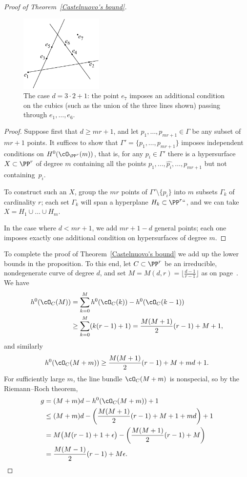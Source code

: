 \begin{proof}[Proof of Theorem~\ref{Castelnuovo's bound}]
\begin{figure}
\centerline {\includegraphics[height=1.5in]{"main/Fig09-3"}}
\caption{The case $d = 3\cdot 2+1$: the point $e_{7}$ imposes an additional
condition on the cubics (such as the union of the three lines shown)
passing through
$e_{1},\dots, e_{6}$.}
\label{Fig9.3}
\end{figure}

\begin{proof}
Suppose first that $d \geq mr+1$, and let $p_1,\dots,p_{mr+1} \in
\Gamma$ be any subset of $mr+1$ points. It suffices to show that
$\Gamma' = \{p_1,\dots,p_{mr+1}\}$ imposes independent conditions
on
$H^0(\cO_{\PP^r}(m))$, that is, for any $p_i \in \Gamma'$ there is a
hypersurface $X \subset \PP^r$ of degree $m$ containing all the points
$p_1,\dots, \hat{p_i},\dots,p_{mr+1}$ but not containing~$p_i$.

To construct such an $X$, group the $mr$ points of $\Gamma' \setminus
\{p_i\}$ into $m$ subsets $\Gamma_k$ of cardinality $r$; each set
$\Gamma_k$ will span a hyperplane $H_k \subset \PP^r` `$, and we can
take $X = H_1 \cup \dots \cup H_m$.

In the case where $d<mr+1$, we add $mr+1-d$ general points; each one
imposes exactly one
additional condition on hypersurfaces of degree $m$.
\end{proof}


To complete the proof of Theorem~\ref{Castelnuovo's bound} we add up the
lower bounds in the proposition. To this end, let $C \subset \PP^r$ be
 an irreducible, nondegenerate curve of degree $d$, and  set
$M= M(d,r) = \bigl\lfloor{\frac{d-1}{r-1}}\bigr\rfloor$
as on page~\pageref{def of M}.
We have
\begin{align*}
h^0(\cO_C(M)) &= \sum_{k=0}^M h^0(\cO_C(k)) - h^0(\cO_C(k-1)) \\
&\geq  \sum_{k=0}^M (k(r-1)+1)
= \frac{M(M+1)}{2}(r-1) + M + 1
,
\end{align*}
and similarly
$$
h^0(\cO_C(M+m)) \geq \frac{M(M+1)}{2}(r-1) + M  + md+ 1
.
$$
For sufficiently large $m$, the line bundle $\cO_C(M+m)$ is nonspecial,
so by the
Riemann--Roch theorem,
%
\begin{align*}
g &= (M+m)d - h^0(\cO_C(M+m)) + 1 \\
&\leq (M+m)d - \left(  \frac{M(M+1)}{2}(r-1) + M + 1 + md \right)+1 \\
& = M\bigl( M(r-1) + 1 + \epsilon \bigr) - \left(  \frac{M(M+1)}{2}(r-1)
+ M  \right) \\
&= \frac{M(M-1)}{2}(r-1) + M\epsilon.
\end{align*}



\end{proof}
